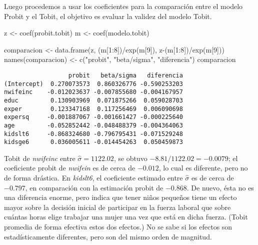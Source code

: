 \documentclass[
  letterpaper,
  DIV=11,
  numbers=noendperiod]{scrreprt}
\newenvironment{Shaded}{\begin{snugshade}}{\end{snugshade}}
\newcommand{\DecValTok}[1]{\textcolor[rgb]{0.68,0.00,0.00}{#1}}
\newcommand{\FunctionTok}[1]{\textcolor[rgb]{0.28,0.35,0.67}{#1}}
\newcommand{\NormalTok}[1]{\textcolor[rgb]{0.00,0.23,0.31}{#1}}
\newcommand{\OtherTok}[1]{\textcolor[rgb]{0.00,0.23,0.31}{#1}}
\newcommand{\SpecialCharTok}[1]{\textcolor[rgb]{0.37,0.37,0.37}{#1}}
\newcommand{\StringTok}[1]{\textcolor[rgb]{0.13,0.47,0.30}{#1}}
\begin{document}
Luego procedemos a usar los coeficientes para la comparación entre el
modelo Probit y el Tobit, el objetivo es evaluar la validez del modelo
Tobit.

\begin{Shaded}
\begin{Highlighting}[]
\NormalTok{z }\OtherTok{\textless{}{-}} \FunctionTok{coef}\NormalTok{(probit.tobit)}
\NormalTok{m }\OtherTok{\textless{}{-}} \FunctionTok{coef}\NormalTok{(modelo.tobit)}

\NormalTok{comparacion }\OtherTok{\textless{}{-}} \FunctionTok{data.frame}\NormalTok{(z, (m[}\DecValTok{1}\SpecialCharTok{:}\DecValTok{8}\NormalTok{])}\SpecialCharTok{/}\FunctionTok{exp}\NormalTok{(m[}\DecValTok{9}\NormalTok{]), z}\SpecialCharTok{{-}}\NormalTok{(m[}\DecValTok{1}\SpecialCharTok{:}\DecValTok{8}\NormalTok{])}\SpecialCharTok{/}\FunctionTok{exp}\NormalTok{(m[}\DecValTok{9}\NormalTok{]))}
\FunctionTok{names}\NormalTok{(comparacion) }\OtherTok{\textless{}{-}} \FunctionTok{c}\NormalTok{(}\StringTok{"probit"}\NormalTok{, }\StringTok{"beta/sigma"}\NormalTok{, }\StringTok{"diferencia"}\NormalTok{)}
\NormalTok{comparacion}
\end{Highlighting}
\end{Shaded}

\begin{verbatim}
                  probit   beta/sigma   diferencia
(Intercept)  0.270073573  0.860326776 -0.590253203
nwifeinc    -0.012023637 -0.007855680 -0.004167957
educ         0.130903969  0.071875266  0.059028703
exper        0.123347168  0.117256469  0.006090698
expersq     -0.001887067 -0.001661427 -0.000225640
age         -0.052852442 -0.048488379 -0.004364063
kidslt6     -0.868324680 -0.796795431 -0.071529248
kidsge6      0.036005611 -0.014454263  0.050459873
\end{verbatim}

Tobit de \emph{nwifeinc} entre \(\widehat{\sigma}=1122.02\), se obtuvo
\(-8.81/1122.02=-0.0079\); el coeficiente probit de \emph{nwifein} es de
cerca de \(-0.012\), lo cual es diferente, pero no de forma drástica. En
\emph{kidslt6}, el coeficiente estimado entre \(\widehat{\sigma}\) es de
cerca de \(-0.797\), en comparación con la estimación probit de
\(-0.868\). De nuevo, ésta no es una diferencia enorme, pero indica que
tener niños pequeños tiene un efecto mayor sobre la decisión inicial de
participar en la fuerza laboral que sobre cuántas horas elige trabajar
una mujer una vez que está en dicha fuerza. (Tobit promedia de forma
efectiva estos dos efectos.) No se sabe si los efectos son
estadísticamente diferentes, pero son del mismo orden de magnitud.
\end{document}
